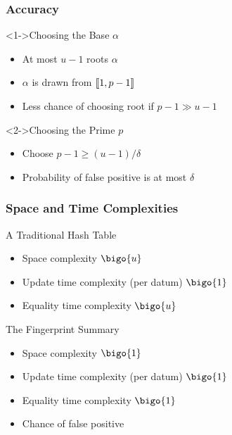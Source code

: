 \begin{frame}
  \frametitle{Accuracy}

  \begin{block}<1->{Choosing the Base \( \alpha \)}
    \begin{itemize}
      \item At most \( u - 1 \) roots \( \alpha \)
      \item \( \alpha \) is drawn from \( \llbracket1, p - 1\rrbracket \)
      \item Less chance of choosing root if \( p - 1 \gg u - 1 \)
    \end{itemize}
  \end{block}

  \begin{block}<2->{Choosing the Prime \( p \)}
    \begin{itemize}
      \item Choose \( p - 1 \geq (u - 1) / \delta \)
      \item Probability of false positive is at most \( \delta \)
    \end{itemize}
  \end{block}
\end{frame}

\begin{frame}
  \frametitle{Space and Time Complexities}

  \begin{block}{A Traditional Hash Table}
    \begin{itemize}
      \item<alert@2> Space complexity \( \bigo{u} \)
      \item<alert@3> Update time complexity (per datum) \( \bigo{1} \)
      \item<alert@4> Equality time complexity \( \bigo{u} \)
    \end{itemize}
  \end{block}

  \begin{block}{The Fingerprint Summary}
    \begin{itemize}
      \item<alert@2> Space complexity \( \bigo{1} \)
      \item<alert@3> Update time complexity (per datum) \( \bigo{1} \)
      \item<alert@5> Equality time complexity \( \bigo{1} \)
      \item<alert@5> Chance of false positive
    \end{itemize}
  \end{block}
\end{frame}
